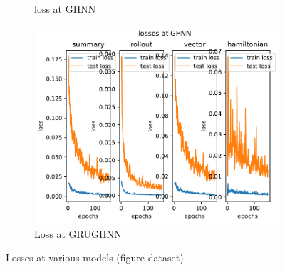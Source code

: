 \begin{figure}[H]
\begin{subfigure}[b]{0.3\textwidth}
		\caption{loss at GHNN}
	\end{subfigure}
	\hfill
	\begin{subfigure}[b]{0.3\textwidth}
		\centering
		\includegraphics[width=\textwidth]{chapters/chapter5/fignew_grughnn_loss.pdf}
		\caption{Loss at GRUGHNN}
	\end{subfigure}
	
	\caption{Losses at various models (figure dataset)}
	\label{fig_loss}
\end{figure}

